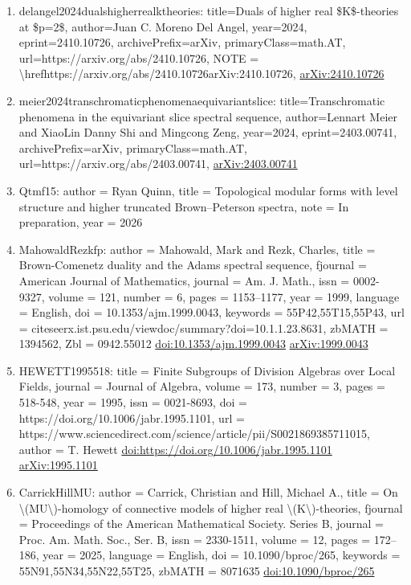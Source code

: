 \documentclass[11pt]{article}
\begin{document}
\begin{enumerate}[leftmargin=*]
  \item delangel2024dualshigherrealktheories: title=Duals of higher real \$K\$-theories at \$p=2\$, author=Juan C. Moreno Del Angel, year=2024, eprint=2410.10726, archivePrefix=arXiv, primaryClass=math.AT, url=https://arxiv.org/abs/2410.10726, NOTE = \textbackslash{}hrefhttps://arxiv.org/abs/2410.10726arXiv:2410.10726, \href{https://arxiv.org/abs/2410.10726}{arXiv:2410.10726}
  \item meier2024transchromaticphenomenaequivariantslice: title=Transchromatic phenomena in the equivariant slice spectral sequence, author=Lennart Meier and XiaoLin Danny Shi and Mingcong Zeng, year=2024, eprint=2403.00741, archivePrefix=arXiv, primaryClass=math.AT, url=https://arxiv.org/abs/2403.00741, \href{https://arxiv.org/abs/2403.00741}{arXiv:2403.00741}
  \item Qtmf15: author = Ryan Quinn, title = Topological modular forms with level structure and higher truncated Brown--Peterson spectra, note = In preparation, year = 2026
  \item MahowaldRezkfp: author = Mahowald, Mark and Rezk, Charles, title = Brown-Comenetz duality and the Adams spectral sequence, fjournal = American Journal of Mathematics, journal = Am. J. Math., issn = 0002-9327, volume = 121, number = 6, pages = 1153--1177, year = 1999, language = English, doi = 10.1353/ajm.1999.0043, keywords = 55P42,55T15,55P43, url = citeseerx.ist.psu.edu/viewdoc/summary?doi=10.1.1.23.8631, zbMATH = 1394562, Zbl = 0942.55012 \href{https://doi.org/10.1353/ajm.1999.0043}{doi:10.1353/ajm.1999.0043} \href{https://arxiv.org/abs/1999.0043}{arXiv:1999.0043}
  \item HEWETT1995518: title = Finite Subgroups of Division Algebras over Local Fields, journal = Journal of Algebra, volume = 173, number = 3, pages = 518-548, year = 1995, issn = 0021-8693, doi = https://doi.org/10.1006/jabr.1995.1101, url = https://www.sciencedirect.com/science/article/pii/S0021869385711015, author = T. Hewett \href{https://doi.org/https://doi.org/10.1006/jabr.1995.1101}{doi:https://doi.org/10.1006/jabr.1995.1101} \href{https://arxiv.org/abs/1995.1101}{arXiv:1995.1101}
  \item CarrickHillMU: author = Carrick, Christian and Hill, Michael A., title = On \textbackslash{}(MU\textbackslash{})-homology of connective models of higher real \textbackslash{}(K\textbackslash{})-theories, fjournal = Proceedings of the American Mathematical Society. Series B, journal = Proc. Am. Math. Soc., Ser. B, issn = 2330-1511, volume = 12, pages = 172--186, year = 2025, language = English, doi = 10.1090/bproc/265, keywords = 55N91,55N34,55N22,55T25, zbMATH = 8071635 \href{https://doi.org/10.1090/bproc/265}{doi:10.1090/bproc/265}

\end{enumerate}
\end{document}
